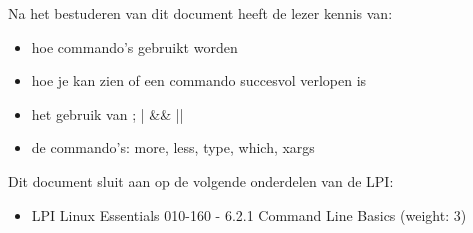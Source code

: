Na het bestuderen van dit document heeft de lezer kennis van:
\begin{itemize}
\item hoe commando's gebruikt worden
\item hoe je kan zien of een commando succesvol verlopen is
\item het gebruik van ; | \&\& ||
\item de commando's: more, less, type, which, xargs
\end{itemize}

Dit document sluit aan op de volgende onderdelen van de LPI:
\begin{itemize}
\item LPI Linux Essentials 010-160 - 6.2.1 Command Line Basics (weight: 3)
\end{itemize}

